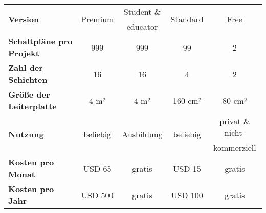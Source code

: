 \begin{tabular}{lcccc}
\toprule
\multirow{2}[2]{*}{\textbf{Version}} & \multirow{2}[2]{*}{Premium} & Student \& & \multirow{2}[2]{*}{Standard} & \multirow{2}[2]{*}{Free} \\
\multicolumn{1}{l}{} & \multicolumn{1}{c}{} & educator & \multicolumn{1}{c}{} & \multicolumn{1}{c}{} \\
\midrule
\textbf{Schaltpläne pro Projekt} & \multicolumn{1}{c}{999} & \multicolumn{1}{c}{999} & \multicolumn{1}{c}{99} & \multicolumn{1}{c}{2} \\
\midrule
\textbf{Zahl der Schichten} & \multicolumn{1}{c}{16} & \multicolumn{1}{c}{16} & \multicolumn{1}{c}{4} & \multicolumn{1}{c}{2} \\
\midrule
\textbf{Größe der Leiterplatte} & 4 m²  & 4 m²  & 160 cm² & 80 cm² \\
\midrule
\multirow{2}[2]{*}{\textbf{Nutzung}} & \multirow{2}[2]{*}{beliebig} & \multirow{2}[2]{*}{Ausbildung} & \multirow{2}[2]{*}{beliebig} & privat \& nicht- \\
\multicolumn{1}{l}{} & \multicolumn{1}{c}{} & \multicolumn{1}{c}{} & \multicolumn{1}{c}{} & kommerziell \\
\midrule
\textbf{Kosten pro Monat} & USD 65 & gratis & USD 15 & gratis \\
\midrule
\textbf{Kosten pro Jahr} & USD 500 & gratis & USD 100 & gratis \\
\bottomrule
\end{tabular}%
